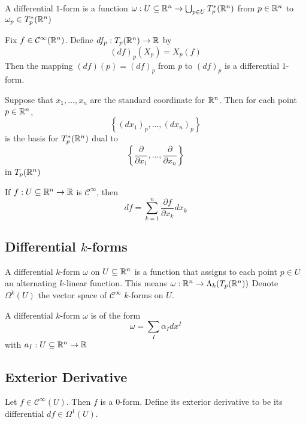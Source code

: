 \documentclass[a4paper]{article}
\begin{document}
\begin{defn} A differential $1$-form is a function $\omega:U\subseteq\mathbb{R}^n\to\bigcup_{p\in U}T_p^\ast(\mathbb{R}^n)$ from $p\in\mathbb{R}^n$ to $\omega_p\in T_p^\ast(\mathbb{R}^n)$
\end{defn}

\begin{prp} Fix $f\in\mathcal{C}^\infty(\mathbb{R}^n)$. Define $df_p:T_p(\mathbb{R}^n)\to\mathbb{R}$ by $$(df)_p(X_p)=X_p(f)$$ Then the mapping $(df)(p)=(df)_p$ from $p$ to $(df)_p$ is a differential $1$-form. 
\end{prp}

\begin{prp} Suppose that $x_1,\dots,x_n$ are the standard coordinate for $\mathbb{R}^n$. Then for each point $p\in\mathbb{R}^n$, $$\left\{(dx_1)_p,\dots,(dx_n)_p\right\}$$ is the basis for $T_p^\ast(\mathbb{R}^n)$ dual to $$\left\{\frac{\partial}{\partial x_1},\dots,\frac{\partial}{\partial x_n}\right\}$$ in $T_p(\mathbb{R}^n)$
\end{prp}

\begin{prp} If $f:U\subseteq\mathbb{R}^n\to\mathbb{R}$ is $\mathcal{C}^\infty$, then $$df=\sum_{k=1}^n\frac{\partial f}{\partial x_k}dx_k$$
\end{prp}

\subsection{Differential $k$-forms}
\begin{defn} A differential $k$-form $\omega$ on $U\subseteq\mathbb{R}^n$ is a function that assigns to each point $p\in U$ an alternating $k$-linear function. This means $\omega:\mathbb{R}^n\to\Lambda_k(T_p(\mathbb{R}^n))$ Denote $\Omega^k(U)$ the vector space of $\mathcal{C}^\infty$ $k$-forms on $U$. 
\end{defn}

\begin{prp} A differential $k$-form $\omega$ is of the form $$\omega=\sum_I\alpha_Idx^I$$ with $a_I:U\subseteq\mathbb{R}^n\to\mathbb{R}$
\end{prp}

\subsection{Exterior Derivative}
\begin{defn} Let $f\in\mathcal{C}^\infty(U)$. Then $f$ is a $0$-form. Define its exterior derivative to be its differential $df\in\Omega^1(U)$. 
\end{defn}
\end{document}
